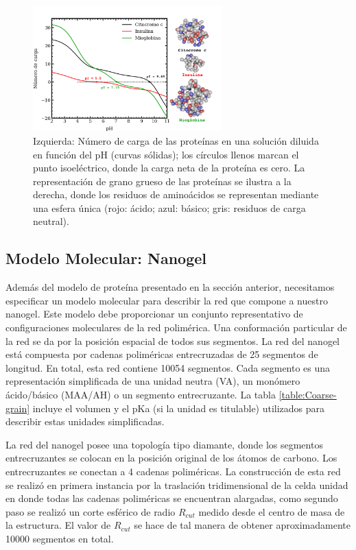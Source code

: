  \begin{figure}[!htb]
     \centering
     \includegraphics[width=0.65\textwidth]{Figures/graphs-gel2/protein-model.pdf}
     \caption{Izquierda: N\'umero de carga de las prote\'inas en una soluci\'on diluida en funci\'on del pH (curvas s\'olidas);
     	los c\'irculos llenos marcan el punto isoel\'ectrico,
     	donde la carga neta de la prote\'ina es cero.
     	La representaci\'on de grano grueso de las prote\'inas se ilustra a la derecha, donde los residuos de amino\'acidos se representan mediante una esfera \'unica (rojo: \'acido; azul: b\'asico; gris: residuos de carga neutral).}
     \label{fig:esf:protein-charge}
 \end{figure}



\subsection{Modelo Molecular: Nanogel}

Adem\'as del modelo de prote\'ina presentado en la secci\'on anterior, necesitamos especificar un modelo molecular para describir la red que compone a nuestro nanogel. Este modelo debe proporcionar un conjunto representativo de configuraciones moleculares de la red polim\'erica. Una conformaci\'on particular de la red se da por la posici\'on espacial de todos sus segmentos.
La red del nanogel est\'a compuesta por cadenas polim\'ericas entrecruzadas de 25 segmentos de longitud. En total, esta red contiene 10054 segmentos. Cada segmento es una representaci\'on simplificada de una unidad neutra (VA), un mon\'omero \'acido/b\'asico (MAA/AH) o un segmento entrecruzante. La tabla \ref{table:Coarse-grain} incluye el volumen y el pKa (si la unidad es titulable) utilizados para describir estas unidades simplificadas.

La red del nanogel posee una topolog\'ia tipo diamante, donde los segmentos entrecruzantes se colocan en la posici\'on original de los \'atomos de carbono. Los entrecruzantes se conectan a 4 cadenas polim\'ericas. La construcci\'on de esta red se realiz\'o en primera instancia por la traslaci\'on tridimensional de la celda unidad en donde todas las cadenas polim\'ericas se encuentran alargadas, como segundo paso se realiz\'o un corte esf\'erico de radio $R_{cut}$ medido desde el centro de masa de la estructura. El valor de $R_{cut}$ se hace de tal manera de obtener aproximadamente 10000 segmentos en total. 

